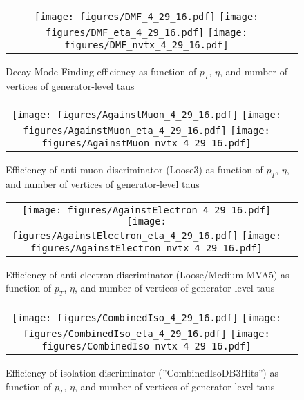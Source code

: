 \begin{figure}[tbh!]
    \centering
    \begin{tabular}{cc}
      \texttt{[image: figures/DMF\_4\_29\_16.pdf]}
      \texttt{[image: figures/DMF\_eta\_4\_29\_16.pdf]}
       \texttt{[image: figures/DMF\_nvtx\_4\_29\_16.pdf]}
    \end{tabular}
    \caption{Decay Mode Finding efficiency as function of $p_{T}$, $\eta$, and number of vertices of generator-level taus }
    \label{fig:DMF}
  \end{figure}
 
\begin{figure}[tbh!]
    \centering
    \begin{tabular}{cc}
      \texttt{[image: figures/AgainstMuon\_4\_29\_16.pdf]}
      \texttt{[image: figures/AgainstMuon\_eta\_4\_29\_16.pdf]}
       \texttt{[image: figures/AgainstMuon\_nvtx\_4\_29\_16.pdf]}
    \end{tabular}
    \caption{Efficiency of anti-muon discriminator (Loose3) as function of $p_{T}$, $\eta$, and number of vertices of generator-level taus }
    \label{fig:ML3}
  \end{figure}


\begin{figure}[tbh!]
    \centering
    \begin{tabular}{cc}
      \texttt{[image: figures/AgainstElectron\_4\_29\_16.pdf]}
      \texttt{[image: figures/AgainstElectron\_eta\_4\_29\_16.pdf]}
       \texttt{[image: figures/AgainstElectron\_nvtx\_4\_29\_16.pdf]}
    \end{tabular}
    \caption{Efficiency of anti-electron discriminator (Loose/Medium MVA5) as function of $p_{T}$, $\eta$, and number of vertices of generator-level taus }
    \label{fig:EM5}
  \end{figure}

\begin{figure}[tbh!]
    \centering
    \begin{tabular}{cc}
      \texttt{[image: figures/CombinedIso\_4\_29\_16.pdf]}
      \texttt{[image: figures/CombinedIso\_eta\_4\_29\_16.pdf]}
       \texttt{[image: figures/CombinedIso\_nvtx\_4\_29\_16.pdf]}
    \end{tabular}
    \caption{Efficiency of isolation discriminator (''CombinedIsoDB3Hits'') as function of $p_{T}$, $\eta$, and number of vertices of generator-level taus }
    \label{fig:TIso}
  \end{figure}



